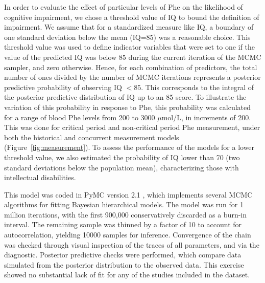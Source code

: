 \documentclass{svjour3}                     %
\begin{document}
In order to evaluate the effect of particular levels of Phe on the likelihood of cognitive impairment, we chose a threshold value of IQ to bound the definition of impairment. We assume that for a standardized measure like IQ, a boundary of one standard deviation below the mean (IQ=85) was a reasonable choice. This threshold value was used to define indicator variables that were set to one if the value of the predicted IQ was below 85 during the current iteration of the MCMC sampler, and zero otherwise. Hence, for each combination of predictors, the total number of ones divided by the number of MCMC iterations represents a posterior predictive probability of observing IQ $< 85$. This corresponds to the integral of the posterior predictive distribution of IQ up to an 85 score. To illustrate the variation of this probability in response to Phe, this probability was calculated for a range of blood Phe levels from 200 to 3000 $\mu$mol/L, in increments of 200.  This was done for critical period and non-critical period Phe measurement, under both the historical and concurrent measurement models (Figure~\ref{fig:measurement}). To assess the performance of the models for a lower threshold value, we also estimated the probability of IQ lower than 70 (two standard deviations below the population mean), characterizing those with intellectual disabilities.

This model was coded in PyMC version 2.1 \citep{Patil:2010tx}, which implements several MCMC algorithms for fitting Bayesian hierarchical models. The model was run for 1 million iterations, with the first 900,000 conservatively discarded as a burn-in interval. The remaining sample was thinned by a factor of 10 to account for autocorrelation, yielding 10000 samples for inference. Convergence of the chain was checked through visual inspection of the traces of all parameters, and via the \citet{Geweke:1992tk} diagnostic. Posterior predictive checks \citep{Gelman:2003vk} were performed, which compare data simulated from the posterior distribution to the observed data. This exercise showed no substantial lack of fit for any of the studies included in the dataset.

\end{document}
